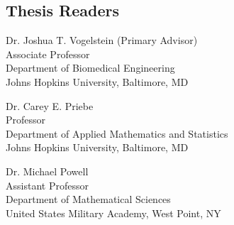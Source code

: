 \begin{singlespace}

\section*{Thesis Readers}

Dr. Joshua T. Vogelstein (Primary Advisor)\\
Associate Professor \\
Department of Biomedical Engineering\\
Johns Hopkins University, Baltimore, MD 

\vspace{0.1in}

Dr. Carey E. Priebe \\
Professor \\
Department of Applied Mathematics and Statistics\\
Johns Hopkins University, Baltimore, MD 

\vspace{0.1in}

Dr. Michael Powell \\
Assistant Professor \\
Department of Mathematical Sciences\\
United States Military Academy, West Point, NY


\end{singlespace}